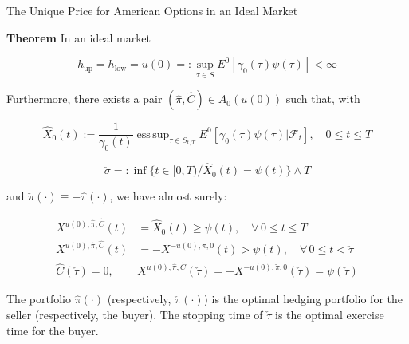 \documentclass{beamer}
\DeclareMathOperator*{\esssup}{ess\,sup}
\begin{document}
\begin{frame}{The Unique Price for American Options in an Ideal Market}

    {\footnotesize \footnotesize
     \textbf{Theorem}  In an ideal market

    \[
    h_{\text{up}} = h_{\text{low}} = u(0) =: \sup_{\tau \in S} E^0[\gamma_0(\tau)\psi(\tau)] < \infty
    \]

    Furthermore, there exists a pair \((\hat{\pi}, \hat{C}) \in A_0(u(0))\) such that, with

    \[
    \hat{X}_0(t) := \frac{1}{\gamma_0(t)} \esssup_{\tau \in S_{t,T}} 
    E^0[\gamma_0(\tau)\psi(\tau)|\mathcal{F}_t], \quad 0 \leq t \leq T
    \]

    \[
    \check{\sigma} =: \inf\{t \in [0, T)/\hat{X}_0(t) = \psi(t)\} \land T
    \]

     \pause and \(\check{\pi}(\cdot) \equiv -\hat{\pi}(\cdot)\), we have almost surely:

    \begin{align*}
    X^{u(0), \hat{\pi}, \hat{C}}(t) &= \hat{X}_0(t) \geq \psi(t), \quad \forall \, 0 \leq t \leq T \\
    X^{u(0), \hat{\pi}, \hat{C}}(t) &= -X^{-u(0), \check{\pi}, 0}(t) > \psi(t), \quad \forall \, 0 \leq t < \check{\tau}\\
    \hat{C}(\check{\tau}) = 0, \quad &X^{u(0), \hat{\pi}, \hat{C}}(\check{\tau}) = -X^{-u(0), \check{\pi}, 0}(\check{\tau}) 
    = \psi(\check{\tau})
    \end{align*}
    
    The portfolio \(\hat{\pi}(\cdot)\) (respectively, \(\check{\pi}(\cdot)\)) is the optimal hedging portfolio 
    for the seller (respectively, the buyer). 
    The stopping time of \(\check{\tau}\) is the optimal exercise time for the buyer.
    }
\end{frame} 
\end{document}
